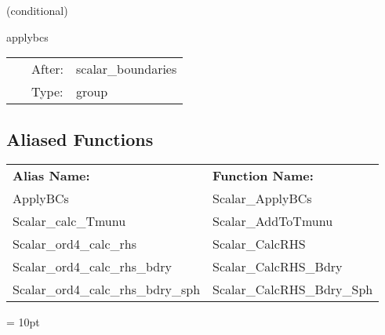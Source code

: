 \vspace{5mm}

   (conditional) 

\hspace{5mm} applybcs 

\hspace{5mm}{\it apply boundary conditions } 


\hspace{5mm}

 \begin{tabular*}{160mm}{cll} 
~ & After:  & scalar\_boundaries \\ 
~ & Type:  & group \\ 
\end{tabular*} 


\subsection*{Aliased Functions}

\hspace{5mm}

 \begin{tabular*}{160mm}{ll} 

{\bf Alias Name:} ~~~~~~~ & {\bf Function Name:} \\ 
ApplyBCs & Scalar\_ApplyBCs \\ 
Scalar\_calc\_Tmunu & Scalar\_AddToTmunu \\ 
Scalar\_ord4\_calc\_rhs & Scalar\_CalcRHS \\ 
Scalar\_ord4\_calc\_rhs\_bdry & Scalar\_CalcRHS\_Bdry \\ 
Scalar\_ord4\_calc\_rhs\_bdry\_sph & Scalar\_CalcRHS\_Bdry\_Sph \\ 
\end{tabular*} 



\vspace{5mm}\parskip = 10pt 

